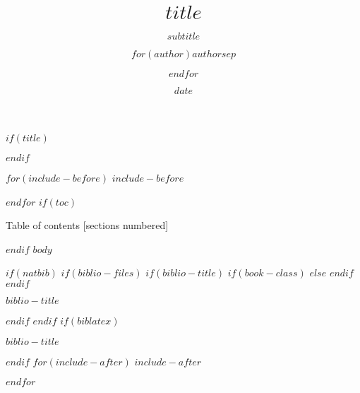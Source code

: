 \documentclass[$if(fontsize)$$fontsize$,$endif$$if(lang)$$babel-lang$,$endif$$if(handout)$handout,$endif$$if(beamer)$gnorenonframetext,$endif$$for(classoption)$$classoption$$sep$,$endfor$$if(make149)$,aspectratio=149$endif$]{$documentclass$}
\title{$title$}
\subtitle{$subtitle$}
\author{$for(author)$$author$$sep$ \and $endfor$}
\date{$date$}
\institute{$institute$}
\begin{document}
$if(title)$
\maketitle
$endif$

$for(include-before)$
$include-before$

$endfor$
$if(toc)$
\begin{frame}{Table of contents}
  [sections numbered]
  \tableofcontents[hideallsubsections]
\end{frame}

$endif$
$body$


$if(natbib)$
$if(biblio-files)$
$if(biblio-title)$
$if(book-class)$
\renewcommand\bibname{$biblio-title$}
$else$
\renewcommand\refname{$biblio-title$}
$endif$
$endif$
\begin{frame}[allowframebreaks]{$biblio-title$}

\end{frame}

$endif$
$endif$
$if(biblatex)$
\begin{frame}{$biblio-title$}

\end{frame}

$endif$
$for(include-after)$
$include-after$

$endfor$
\end{document}
